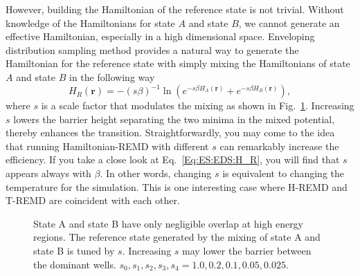However, building the Hamiltonian of the reference state is not trivial. Without knowledge of the Hamiltonians for state $A$ and state $B$, we cannot generate an effective Hamiltonian,
especially in a high dimensional space. Enveloping distribution sampling method provides a natural way to generate the Hamiltonian for the reference state with simply mixing the Hamiltonians of state $A$ and state $B$ in the following way
\begin{equation}
	H_R(\mathbf{r})=-\left(s\beta\right)^{-1}\ln{\left(e^{-s\beta H_A(\mathbf{r})}+e^{-s\beta H_B(\mathbf{r})}\right)},
	\label{Eq:ES:EDS:H_R}
\end{equation}
where $s$ is a scale factor that modulates the mixing\cite{ChristJCTC2009} as shown in Fig.~\ref{Fig:ES:EDS}. Increasing $s$ lowers the barrier height separating the two minima in the mixed potential, thereby enhances the transition. Straightforwardly, you may come to the idea that running Hamiltonian-REMD with different $s$ can remarkably increase the efficiency.
If you take a close look at Eq.~\ref{Eq:ES:EDS:H_R}, you will find that $s$ appears always with $\beta$. In other words, changing $s$ is equivalent to changing the temperature for the simulation. This is one interesting case where H-REMD and T-REMD are coincident with each other. 
\begin{figure}[htbp]
	\centering
	\caption{State A and state B have only negligible overlap at high energy regions. The reference state generated by the mixing of state A and state B is tuned by $s$. Increasing $s$ may lower the barrier between the dominant wells. $s_0, s_1, s_2, s_3, s_4 = 1.0, 0.2, 0.1, 0.05, 0.025$.}\label{Fig:ES:EDS}
\end{figure}

